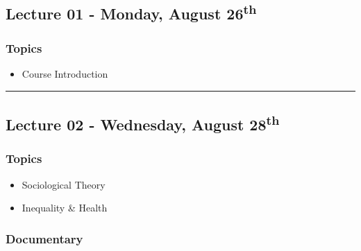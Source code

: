 \documentclass[]{book}
\providecommand{\tightlist}{%
  \setlength{\itemsep}{0pt}\setlength{\parskip}{0pt}}
\begin{document}
\hypertarget{lecture-01---monday-august-26th}{%
\subsection*{\texorpdfstring{Lecture 01 - Monday, August 26\textsuperscript{th}}{Lecture 01 - Monday, August 26th}}\label{lecture-01---monday-august-26th}}

\hypertarget{topics}{%
\subsubsection*{Topics}\label{topics}}

\begin{itemize}
\tightlist
\item
  Course Introduction
\end{itemize}

\begin{center}\rule{0.5\linewidth}{\linethickness}\end{center}

\hypertarget{lecture-02---wednesday-august-28th}{%
\subsection*{\texorpdfstring{Lecture 02 - Wednesday, August 28\textsuperscript{th}}{Lecture 02 - Wednesday, August 28th}}\label{lecture-02---wednesday-august-28th}}

\hypertarget{topics-1}{%
\subsubsection*{Topics}\label{topics-1}}

\begin{itemize}
\tightlist
\item
  Sociological Theory
\item
  Inequality \& Health
\end{itemize}

\hypertarget{documentary}{%
\subsubsection*{Documentary}\label{documentary}}
\end{document}
